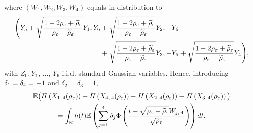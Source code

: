 \documentclass[10pt]{amsart}
\theoremstyle{definition}\newtheorem{defi}[theo]{Definition}\newtheorem{rema}[theo]{Remark}\newtheorem{exam}[theo]{Example}\newtheorem{exem}[theo]{Example}\newtheorem{nota}[theo]{Notation}
\newcommand{\R}{\mathbb{R}}
\newcommand{\E}{\mathbb{E}}
\newcommand{\eps}{\varepsilon}
\let\oldtilde\tilde
\renewcommand*{\tilde}[1]{\mathchoice{\widetilde{#1}}{\widetilde{#1}}{\oldtilde{#1}}{\oldtilde{#1}}}
\begin{document}
where $(W_1,W_2,W_3,W_4)$ equals in distribution to
\begin{align*}
\Bigg(Y_5+\sqrt{\frac{1-2\rho_\eps+\tilde{\rho}_\eps}{\rho_\eps-\tilde{\rho}_\eps}}Y_1,
Y_6 &+\sqrt{\frac{1-2\rho_\eps
+\tilde{\rho}_\eps}{\rho_\eps-\tilde{\rho}_\eps}}Y_2,-Y_6 \\
& +\sqrt{\frac{1-2\rho_\eps+\tilde{\rho}_\eps}{\rho_\eps-\tilde{\rho}_\eps}}Y_3,-Y_5+\sqrt{\frac{1-2\rho_\eps+\tilde{\rho}_\eps}{\rho_\eps-\tilde{\rho}_\eps}}Y_4\Bigg),
\end{align*}
with $Z_0,Y_1,\,\ldots,\,Y_6$ i.i.d. standard Gaussian variables. Hence, introducing $\delta_1=\delta_4\linebreak=-1$ and $\delta_2=\delta_3=1$,
\begin{multline*}
\E\big(H\left(X_{1,\,4}(\rho_\eps)\right)+H\left(X_{4,\,4}(\rho_\eps)\right)-H\left(X_{2,\,4}(\rho_\eps)\right)-H\left(X_{3,\,4}(\rho_\eps)\right)\big)
\\
=\int_\R h(t) \E\left(\sum_{j=1}^{4}\delta_j
\Phi\left(\frac{t-\sqrt{\rho_\eps-\tilde{\rho}_\eps}W_{j,\,4}}{\sqrt{\rho_\eps}}\right) \right)dt.
\end{multline*}
\end{document}
